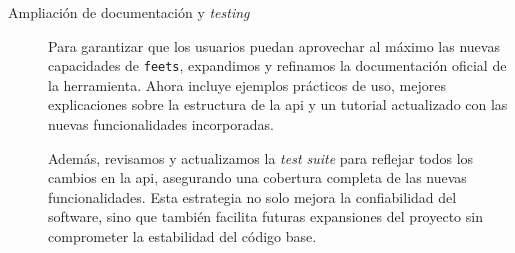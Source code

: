 \begin{description}
    \item[Ampliación de documentación y \emph{testing}] Para garantizar que los usuarios puedan aprovechar al máximo las nuevas capacidades de \texttt{feets}, expandimos y refinamos la documentación oficial de la herramienta. Ahora incluye ejemplos prácticos de uso, mejores explicaciones sobre la estructura de la \gls{api} y un tutorial actualizado con las nuevas funcionalidades incorporadas.

    Además, revisamos y actualizamos la \emph{test suite} para reflejar todos los cambios en la \gls{api}, asegurando una cobertura completa de las nuevas funcionalidades. Esta estrategia no solo mejora la confiabilidad del software, sino que también facilita futuras expansiones del proyecto sin comprometer la estabilidad del código base.
\end{description}